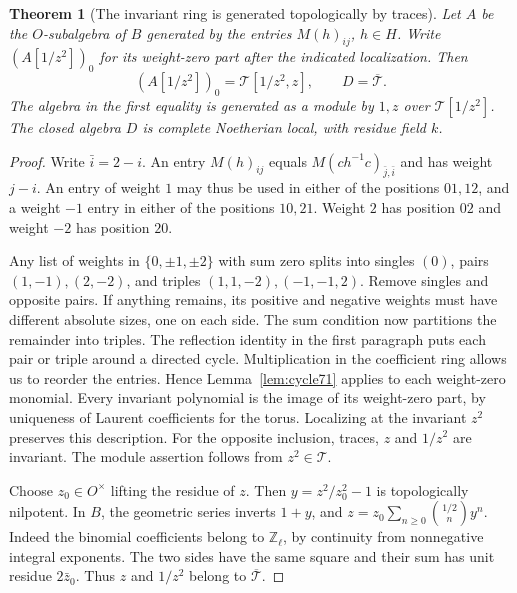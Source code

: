 \documentclass[a4paper,11pt]{article}
\newtheorem{theorem}[proposition]{Theorem}
\theoremstyle{definition}
\theoremstyle{remark}
\newcommand{\ZZ}{\mathbb Z}\newcommand{\ord}{\operatorname{ord}}
\numberwithin{equation}{section}
\begin{document}
\begin{theorem}[The invariant ring is generated topologically by traces]\label{thm:trace71}
Let \(A\) be the \(O\)-subalgebra of \(B\) generated by the
entries \(M(h)_{ij}\), \(h\in H\). Write \((A[1/z^2])_0\)
for its weight-zero part after the indicated localization. Then
\[
          (A[1/z^2])_0=\mathcal T[1/z^2,z],
          \qquad D=\overline{\mathcal T}.
\]
The algebra in the first equality is generated as a module by
\(1,z\) over \(\mathcal T[1/z^2]\). The closed algebra \(D\)
is complete Noetherian local, with residue field \(k\).
\end{theorem}
\begin{proof}
Write \(\bar i=2-i\). An entry \(M(h)_{ij}\) equals
\(M(ch^{-1}c)_{\bar j,\bar i}\) and has weight \(j-i\).
An entry of weight \(1\) may thus be used in either of the
positions \(01,12\), and a weight \(-1\) entry in either
of the positions \(10,21\). Weight \(2\) has position
\(02\) and weight \(-2\) has position \(20\).

Any list of weights in \(\{0,\pm1,\pm2\}\) with sum zero
splits into singles \((0)\), pairs \((1,-1),(2,-2)\),
and triples \((1,1,-2),(-1,-1,2)\). Remove singles and
opposite pairs. If anything remains, its positive and negative
weights must have different absolute sizes, one on each side.
The sum condition now partitions the remainder into triples.
The reflection identity in the first paragraph puts each pair
or triple around a directed cycle. Multiplication in the
coefficient ring allows us to reorder the entries. Hence
Lemma~\ref{lem:cycle71} applies to each weight-zero monomial.
Every invariant polynomial is the image of its weight-zero
part, by uniqueness of Laurent coefficients for the torus.
Localizing at the invariant \(z^2\) preserves this description.
For the opposite inclusion, traces, \(z\) and \(1/z^2\) are
invariant. The module assertion follows from \(z^2\in\mathcal T\).

Choose \(z_0\in O^\times\) lifting the residue of \(z\).
Then \(y=z^2/z_0^2-1\) is topologically nilpotent.
In \(B\), the geometric series inverts \(1+y\), and
\(z=z_0\sum_{n\ge0}\binom{1/2}{n}y^n\).
Indeed the binomial coefficients belong to \(\ZZ_\ell\), by
continuity from nonnegative integral exponents. The two sides
have the same square and their sum has unit residue \(2\bar z_0\).
Thus \(z\) and \(1/z^2\) belong to \(\overline{\mathcal T}\).


\end{proof}
\end{document}
